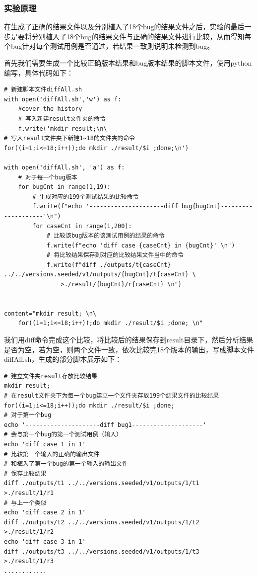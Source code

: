 \documentclass[12pt, a4paper, oneside,bibend=bibtex]{ctexart}
\begin{document}
\subsubsection{实验原理}
在生成了正确的结果文件以及分别植入了18个bug的结果文件之后，实验的最后一步是要将分别植入了18个bug的结果文件与正确的结果文件进行比较，从而得知每个bug针对每个测试用例是否通过，若结果一致则说明未检测到bug。

首先我们需要生成一个比较正确版本结果和bug版本结果的脚本文件，使用python编写，具体代码如下：
\begin{lstlisting}[caption={}]
# 新建脚本文件diffAll.sh
with open('diffAll.sh','w') as f:
    #cover the history
    # 写入新建result文件夹的命令
    f.write('mkdir result;\n\
# 写入result文件夹下新建1~18的文件夹的命令
for((i=1;i<=18;i++));do mkdir ./result/$i ;done;\n')

with open('diffAll.sh', 'a') as f:
    # 对于每一个bug版本
    for bugCnt in range(1,19):
        # 生成对应的199个测试结果的比较命令
        f.write(f"echo '---------------------diff bug{bugCnt}--------------------'\n")
        for caseCnt in range(1,200):
            # 比较该bug版本的该测试用例的结果的命令
            f.write(f"echo 'diff case {caseCnt} in {bugCnt}' \n")
            # 将比较结果保存到对应的比较结果文件当中的命令
            f.write(f"diff ./outputs/t{caseCnt} ../../versions.seeded/v1/outputs/{bugCnt}/t{caseCnt} \
                >./result/{bugCnt}/r{caseCnt} \n")
    
    
content="mkdir result; \n\
    for((i=1;i<=18;i++));do mkdir ./result/$i ;done; \n"
\end{lstlisting}

我们用diff命令完成这个比较，将比较后的结果保存到result目录下，然后分析结果是否为空，若为空，则两个文件一致，依次比较完18个版本的输出，写成脚本文件diffAll.sh，生成的部分脚本展示如下：

\begin{lstlisting}[caption={}]
# 建立文件夹result存放比较结果
mkdir result;
# 在result文件夹下为每一个bug建立一个文件夹存放199个结果文件的比较结果
for((i=1;i<=18;i++));do mkdir ./result/$i ;done;
# 对于第一个bug
echo '---------------------diff bug1--------------------'
# 会与第一个bug的第一个测试用例（输入）
echo 'diff case 1 in 1' 
# 比较第一个输入的正确的输出文件
# 和植入了第一个bug的第一个输入的输出文件
# 保存比较结果
diff ./outputs/t1 ../../versions.seeded/v1/outputs/1/t1                 >./result/1/r1 
# 与上一个类似
echo 'diff case 2 in 1' 
diff ./outputs/t2 ../../versions.seeded/v1/outputs/1/t2                 >./result/1/r2 
echo 'diff case 3 in 1' 
diff ./outputs/t3 ../../versions.seeded/v1/outputs/1/t3                 >./result/1/r3 
............
\end{lstlisting}
\end{document}
